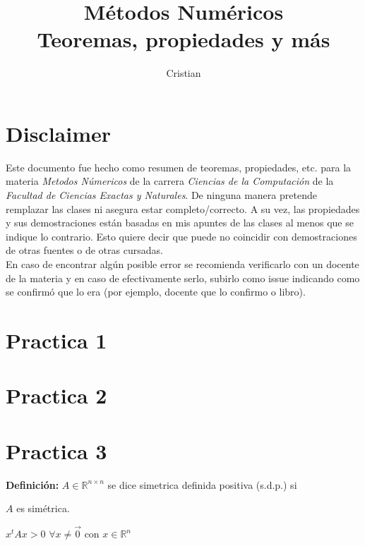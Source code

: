 \documentclass[10pt,a4paper,twoside]{article}
\author{Cristian}
\title{Métodos Numéricos \\
\large Teoremas, propiedades y más}
\newcommand{\definicion}[1]{\textbf{Definición:} #1}
\begin{document}
\maketitle
\cleardoublepage
\section{Disclaimer}
Este documento fue hecho como resumen de teoremas, propiedades, etc. para la materia \textit{Metodos Númericos} de la carrera \textit{Ciencias de la Computación} de la \textit{Facultad de Ciencias Exactas y Naturales}. De ninguna manera pretende remplazar las clases ni asegura estar completo/correcto. A su vez, las propiedades y sus demostraciones están basadas en mis apuntes de las clases al menos que se indique lo contrario. Esto quiere decir que puede no coincidir con demostraciones de otras fuentes o de otras cursadas.
\\
En caso de encontrar algún posible error se recomienda verificarlo con un docente de la materia y en caso de efectivamente serlo, subirlo como issue indicando como se confirmó que lo era (por ejemplo, docente que lo confirmo o libro).
\cleardoublepage
\section{Practica 1}
\cleardoublepage
\section{Practica 2}
\cleardoublepage
\section{Practica 3}
\definicion{$A \in \mathbb{R}^{n \times n}$ se dice simetrica definida positiva (s.d.p.) si
\\
\begin{center}
$A$ es simétrica.
\end{center}
\begin{center}
$x^{t}Ax > 0$ $\forall x \neq \overrightarrow{0}$ con $x \in \mathbb{R}^{n}$
\end{center}
}
\end{document}
